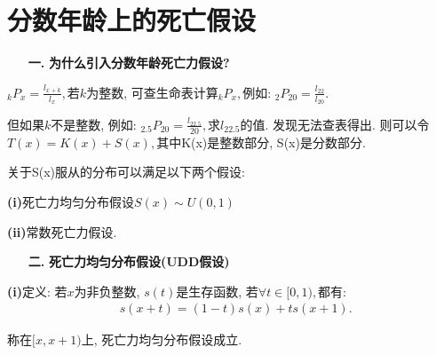 \documentclass[a4paper,10pt]{ctexbook}
\newcommand{\hei}{\CJKfamily{hei}}      %
\begin{document}
\section{分数年龄上的死亡假设}
\begin{itemize}
    \item[{\bf\hei 一.}]{\bf\hei 为什么引入分数年龄死亡力假设?}
\end{itemize}

$_{k}P_{x}=\frac{l_{x+k}}{l_{x}},$若$k$为整数, 可查生命表计算$_{k}P_{x},$例如: $_{2}P_{20}=\frac{l_{22}}{l_{20}}.$

但如果$k$不是整数, 例如: $_{2.5}P_{20}=\frac{l_{22.5}}{20},$求$l_{22.5}$的值. 发现无法查表得出.
则可以令$T(x)=K(x)+S(x),$其中K(x)是整数部分, S(x)是分数部分.

关于S(x)服从的分布可以满足以下两个假设:

{\rm\bf(i)}死亡力均匀分布假设$S(x)\sim U(0,1)$

{\rm\bf(ii)}常数死亡力假设.

\begin{itemize}
    \item[{\bf\hei 二.}]{\bf\hei 死亡力均匀分布假设(UDD假设)}
\end{itemize}

{\rm\bf(i)}定义: 若$x$为非负整数, $s(t)$是生存函数, 若$\forall t\in [0,1),$都有:
\begin{align}\label{tul}
     & s(x+t)=(1-t)s(x)+ts(x+1).
\end{align}

称在$[x,x+1)$上, 死亡力均匀分布假设成立.
\end{document}
